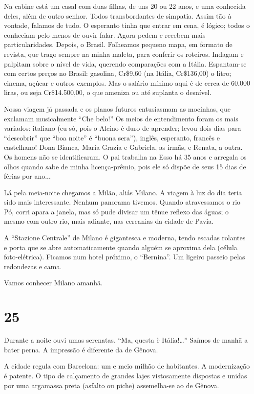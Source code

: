 Na cabine está um casal com duas filhas, de uns 20 ou 22 anos, e uma conhecida deles, além de outro senhor. Todos transbordantes de simpatia. Assim tão à vontade, falamos de tudo. O esperanto tinha que entrar em cena, é lógico; todos o conheciam pelo menos de ouvir falar. Agora pedem e recebem mais particularidades. Depois, o Brasil. Folheamos pequeno mapa, em formato de revista, que trago sempre na minha maleta, para conferir os roteiros. Indagam e palpitam sobre o nível de vida, querendo comparações com a Itália. Espantam-se com certos preços no Brasil: gasolina, Cr\$9,60 (na Itália, Cr\$136,00) o litro; cinema, açúcar e outros exemplos. Mas o salário mínimo aqui é de cerca de 60.000 liras, ou seja Cr\$14.500,00, o que ameniza ou até suplanta o desnível.

Nossa viagem já passada e os planos futuros entusiasmam as mocinhas, que exclamam musicalmente ``Che belo!'' Os meios de entendimento foram os mais variados: italiano (eu só, pois o Alcino é duro de aprender; levou dois dias para ``descobrir'' que ``boa noite'' é ``buona sera''), inglês, esperanto, francês e castelhano! Dona Bianca, Maria Grazia e Gabriela, as irmãs, e Renata, a outra. Os homens não se identificaram. O pai trabalha na Esso há 35 anos e arregala os olhos quando sabe de minha licença-prêmio, pois ele só dispõe de seus 15 dias de férias por ano...

Lá pela meia-noite chegamos a Milão, aliás Milano. A viagem à luz do dia teria sido mais interessante. Nenhum panorama tivemos. Quando atravessamos o rio Pó, corri apara a janela, mas só pude divisar um tênue reflexo das águas; o mesmo com outro rio, mais adiante, nas cercanias da cidade de Pavia.

A ``Stazione Centrale'' de Milano é gigantesca e moderna, tendo escadas rolantes e porta que se abre automaticamente quando alguém se aproxima dela (célula foto-elétrica). Ficamos num hotel próximo, o ``Bernina''. Um ligeiro passeio pelas redondezas e cama.

Vamos conhecer Milano amanhã.

\section*{25 \adfflatleafright {}}
Durante a noite ouvi umas serenatas. ``Ma, questa è Itália!\ldots'' Saímos de manhã a bater perna. A impressão é diferente da de Gênova.

A cidade regula com Barcelona: um e meio milhão de habitantes. A modernização é patente. O tipo de calçamento de grandes lajes vistosamente dispostas e unidas por uma argamassa preta (asfalto ou piche) assemelha-se ao de Gênova.

